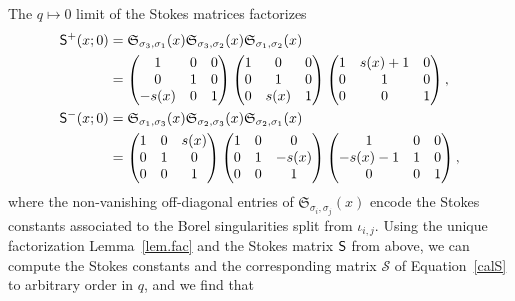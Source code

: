 \documentclass[12pt,reqno]{amsart}
\theoremstyle{definition}
\def\calS{\mathcal S}
\def\s{\sigma}
\def\-{\,-\,}
\def\mfS{\mathfrak{S}}
\def\ms{\mathsf}
\begin{document}
The $q\mapsto 0$ limit of the Stokes matrices factorizes
\begin{align}
  \notag
  \ms{S}^+(x;0)  &=
  \mfS_{\s_3,\s_1}(x)\mfS_{\s_3,\s_2}(x)\mfS_{\s_1,\s_2}(x)
    \\ &=
     \begin{pmatrix}
       1&0&0\\0&1&0\\-s(x)&0&1
     \end{pmatrix}
     \begin{pmatrix}
       1&0&0\\0&1&0\\0&s(x)&1
     \end{pmatrix}
     \begin{pmatrix}
      1&s(x)+1&0\\0&1&0\\0&0&1
    \end{pmatrix},  \label{eq:S0px52}\\
    \notag
  \ms{S}^-(x;0)  &=
  \mfS_{\s_1,\s_3}(x)\mfS_{\s_2,\s_3}(x)\mfS_{\s_2,\s_1}(x)
    \\ &=
     \begin{pmatrix}
       1&0&s(x)\\0&1&0\\0&0&1
     \end{pmatrix}
     \begin{pmatrix}
       1&0&0\\0&1&-s(x)\\0&0&1
     \end{pmatrix}
     \begin{pmatrix}
      1&0&0\\-s(x)-1&1&0\\0&0&1
    \end{pmatrix}, \label{eq:S0nx52}
\end{align}
where the non-vanishing off-diagonal entries of $\mfS_{\s_i,\s_j}(x)$
encode the Stokes constants associated to the Borel singularities
split from $\iota_{i,j}$.  Using the unique factorization
Lemma~\ref{lem.fac} and the Stokes matrix $\sf{S}$ from above, we can
compute the Stokes constants and the corresponding matrix $\calS$ of
Equation~\eqref{calS} to arbitrary order in $q$, and we find that
\end{document}
